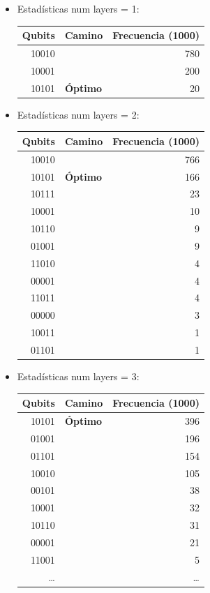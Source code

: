 \documentclass[letterpaper]{article}
\begin{document}
\begin{itemize}
\item Estadísticas num layers = 1:
\begin{center}
\begin{tabular}{|r|l|r|}
\hline
\textbf{Qubits} & \textbf{Camino} & \textbf{Frecuencia (1000)}\\
\hline
10010 &  & 780\\
10001 &  & 200\\
10101 & \textbf{Óptimo} & 20\\
\hline
\end{tabular}
\end{center}

\item Estadísticas num layers = 2:
\begin{center}
\begin{tabular}{|r|l|r|}
\hline
\textbf{Qubits} & \textbf{Camino} & \textbf{Frecuencia (1000)}\\
\hline
10010 &  & 766\\
10101 & \textbf{Óptimo} & 166\\
10111 &  & 23\\
10001 &  & 10\\
10110 &  & 9\\
01001 &  & 9\\
11010 &  & 4\\
00001 &  & 4\\
11011 &  & 4\\
00000 &  & 3\\
10011 &  & 1\\
01101 &  & 1\\
\hline
\end{tabular}
\end{center}

\item Estadísticas num layers = 3:
\begin{center}
\begin{tabular}{|r|l|r|}
\hline
\textbf{Qubits} & \textbf{Camino} & \textbf{Frecuencia (1000)}\\
\hline
10101 & \textbf{Óptimo} & 396\\
01001 &  & 196\\
01101 &  & 154\\
10010 &  & 105\\
00101 &  & 38\\
10001 &  & 32\\
10110 &  & 31\\
00001 &  & 21\\
11001 &  & 5\\
\ldots{} &  & \ldots{}\\
\hline
\end{tabular}
\end{center}


\end{itemize}
\end{document}

